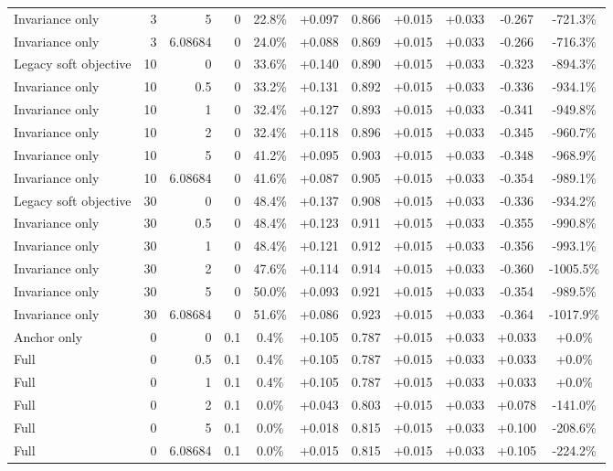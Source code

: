 \begin{table}[htbp]
\begin{tabular}{lrrrccccccc}
Invariance only & 3 & 5 & 0 & 22.8\% & +0.097 & 0.866 & +0.015 & +0.033 & -0.267 & -721.3\% \\
Invariance only & 3 & 6.08684 & 0 & 24.0\% & +0.088 & 0.869 & +0.015 & +0.033 & -0.266 & -716.3\% \\
Legacy soft objective & 10 & 0 & 0 & 33.6\% & +0.140 & 0.890 & +0.015 & +0.033 & -0.323 & -894.3\% \\
Invariance only & 10 & 0.5 & 0 & 33.2\% & +0.131 & 0.892 & +0.015 & +0.033 & -0.336 & -934.1\% \\
Invariance only & 10 & 1 & 0 & 32.4\% & +0.127 & 0.893 & +0.015 & +0.033 & -0.341 & -949.8\% \\
Invariance only & 10 & 2 & 0 & 32.4\% & +0.118 & 0.896 & +0.015 & +0.033 & -0.345 & -960.7\% \\
Invariance only & 10 & 5 & 0 & 41.2\% & +0.095 & 0.903 & +0.015 & +0.033 & -0.348 & -968.9\% \\
Invariance only & 10 & 6.08684 & 0 & 41.6\% & +0.087 & 0.905 & +0.015 & +0.033 & -0.354 & -989.1\% \\
Legacy soft objective & 30 & 0 & 0 & 48.4\% & +0.137 & 0.908 & +0.015 & +0.033 & -0.336 & -934.2\% \\
Invariance only & 30 & 0.5 & 0 & 48.4\% & +0.123 & 0.911 & +0.015 & +0.033 & -0.355 & -990.8\% \\
Invariance only & 30 & 1 & 0 & 48.4\% & +0.121 & 0.912 & +0.015 & +0.033 & -0.356 & -993.1\% \\
Invariance only & 30 & 2 & 0 & 47.6\% & +0.114 & 0.914 & +0.015 & +0.033 & -0.360 & -1005.5\% \\
Invariance only & 30 & 5 & 0 & 50.0\% & +0.093 & 0.921 & +0.015 & +0.033 & -0.354 & -989.5\% \\
Invariance only & 30 & 6.08684 & 0 & 51.6\% & +0.086 & 0.923 & +0.015 & +0.033 & -0.364 & -1017.9\% \\
Anchor only & 0 & 0 & 0.1 & 0.4\% & +0.105 & 0.787 & +0.015 & +0.033 & +0.033 & +0.0\% \\
Full & 0 & 0.5 & 0.1 & 0.4\% & +0.105 & 0.787 & +0.015 & +0.033 & +0.033 & +0.0\% \\
Full & 0 & 1 & 0.1 & 0.4\% & +0.105 & 0.787 & +0.015 & +0.033 & +0.033 & +0.0\% \\
Full & 0 & 2 & 0.1 & 0.0\% & +0.043 & 0.803 & +0.015 & +0.033 & +0.078 & -141.0\% \\
Full & 0 & 5 & 0.1 & 0.0\% & +0.018 & 0.815 & +0.015 & +0.033 & +0.100 & -208.6\% \\
Full & 0 & 6.08684 & 0.1 & 0.0\% & +0.015 & 0.815 & +0.015 & +0.033 & +0.105 & -224.2\% \\

\end{tabular}
\end{table}

